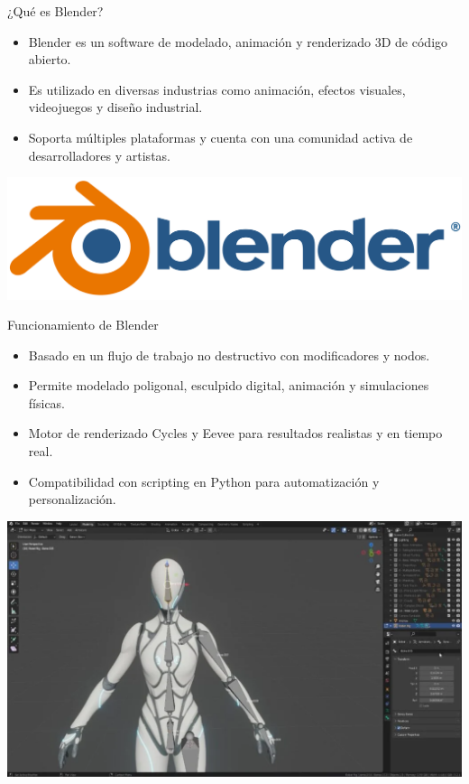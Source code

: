 \begin{frame}{¿Qué es Blender?}
    \begin{itemize}
        \item Blender es un software de modelado, animación y renderizado 3D de código abierto.
        \item Es utilizado en diversas industrias como animación, efectos visuales, videojuegos y diseño industrial.
        \item Soporta múltiples plataformas y cuenta con una comunidad activa de desarrolladores y artistas.
    \end{itemize}
    \begin{center}
        \includegraphics[width=0.6\linewidth]{Logo_Blender.png}
    \end{center}
\end{frame}

\begin{frame}{Funcionamiento de Blender}
    \begin{itemize}
        \item Basado en un flujo de trabajo no destructivo con modificadores y nodos.
        \item Permite modelado poligonal, esculpido digital, animación y simulaciones físicas.
        \item Motor de renderizado Cycles y Eevee para resultados realistas y en tiempo real.
        \item Compatibilidad con scripting en Python para automatización y personalización.
    \end{itemize}
    \begin{center}
        \includegraphics[width=0.6\linewidth]{blender.png}
    \end{center}
\end{frame}

